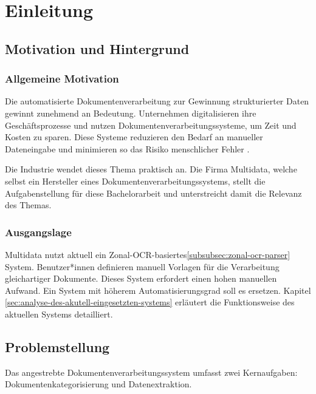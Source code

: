 \chapter{Einleitung}
\label{cha:einleitung}

\section{Motivation und Hintergrund}
\label{sec:motivation-und-hintergrund}

\subsection{Allgemeine Motivation}
\label{subsec:allgemeine-motivation}

Die automatisierte Dokumentenverarbeitung zur Gewinnung strukturierter Daten gewinnt zunehmend an Bedeutung. Unternehmen digitalisieren ihre Geschäftsprozesse und nutzen Dokumentenverarbeitungssysteme, um Zeit und Kosten zu sparen. Diese Systeme reduzieren den Bedarf an manueller Dateneingabe und minimieren so das Risiko menschlicher Fehler \parencite{PerotVincent2024LLMD}.

Die Industrie wendet dieses Thema praktisch an. Die Firma Multidata, welche selbst ein Hersteller eines Dokumentenverarbeitungssystems, stellt die Aufgabenstellung für diese Bachelorarbeit und unterstreicht damit die Relevanz des Themas.

\subsection{Ausgangslage}
\label{subsec:ausgangslage}

Multidata nutzt aktuell ein Zonal-\gls{OCR}-basiertes\ref{subsubsec:zonal-ocr-parser} System. Benutzer*innen definieren manuell Vorlagen für die Verarbeitung gleichartiger Dokumente. Dieses System erfordert einen hohen manuellen Aufwand. Ein System mit höherem Automatisierungsgrad soll es ersetzen. Kapitel \ref{sec:analyse-des-akutell-eingesetzten-systems} erläutert die Funktionsweise des aktuellen Systems detailliert.

\section{Problemstellung}
\label{sec:problemstellung}

Das angestrebte Dokumentenverarbeitungssystem umfasst zwei Kernaufgaben: Dokumentenkategorisierung und Datenextraktion.

